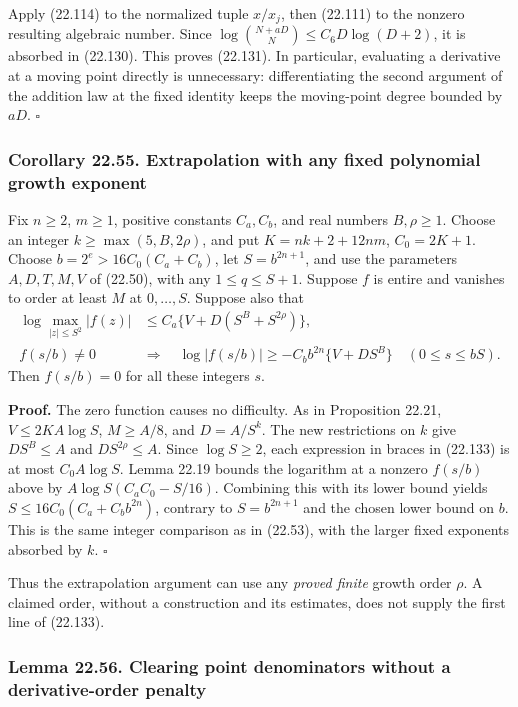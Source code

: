\documentclass[
  11pt,
  a4paper,
]{article}
\begin{document}
Apply (22.114) to the normalized tuple \(x/x_j\), then (22.111) to the
nonzero resulting algebraic number. Since
\(\log\binom{N+aD}{N}\le C_6D\log(D+2)\), it is absorbed in (22.130).
This proves (22.131). In particular, evaluating a derivative at a moving
point directly is unnecessary: differentiating the second argument of
the addition law at the fixed identity keeps the moving-point degree
bounded by \(aD\). \(\square\)

\subsubsection{Corollary 22.55. Extrapolation with any fixed polynomial
growth
exponent}\label{corollary-22.55.-extrapolation-with-any-fixed-polynomial-growth-exponent}

Fix \(n\ge2\), \(m\ge1\), positive constants \(C_a,C_b\), and real
numbers \(B,\rho\ge1\). Choose an integer \(k\ge\max(5,B,2\rho)\), and
put \(K=nk+2+12nm\), \(C_0=2K+1\). Choose \(b=2^e>16C_0(C_a+C_b)\), let
\(S=b^{2n+1}\), and use the parameters \(A,D,T,M,V\) of (22.50), with
any \(1\le q\le S+1\). Suppose \(f\) is entire and vanishes to order at
least \(M\) at \(0,\ldots,S\). Suppose also that \[
\begin{split}
 \log\max_{|z|\le S^2}|f(z)|
 &\le C_a\{V+D(S^B+S^{2\rho})\},\\
 f(s/b)\ne0\quad&\Longrightarrow\quad
 \log|f(s/b)|\ge-C_b b^{2n}\{V+DS^B\}
 \quad(0\le s\le bS).
\end{split}
\tag{22.133}
\] Then \(f(s/b)=0\) for all these integers \(s\).

\textbf{Proof.} The zero function causes no difficulty. As in
Proposition 22.21, \(V\le2KA\log S\), \(M\ge A/8\), and \(D=A/S^k\). The
new restrictions on \(k\) give \(DS^B\le A\) and \(DS^{2\rho}\le A\).
Since \(\log S\ge2\), each expression in braces in (22.133) is at most
\(C_0A\log S\). Lemma 22.19 bounds the logarithm at a nonzero \(f(s/b)\)
above by \(A\log S(C_a C_0-S/16)\). Combining this with its lower bound
yields \(S\le16C_0(C_a+C_b b^{2n})\), contrary to \(S=b^{2n+1}\) and the
chosen lower bound on \(b\). This is the same integer comparison as in
(22.53), with the larger fixed exponents absorbed by \(k\). \(\square\)

Thus the extrapolation argument can use any \emph{proved finite} growth
order \(\rho\). A claimed order, without a construction and its
estimates, does not supply the first line of (22.133).

\subsubsection{Lemma 22.56. Clearing point denominators without a
derivative-order
penalty}\label{lemma-22.56.-clearing-point-denominators-without-a-derivative-order-penalty}
\end{document}
